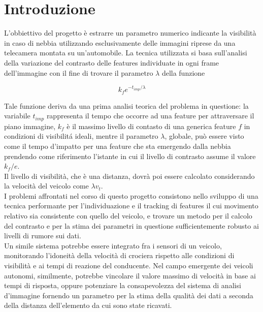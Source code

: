 \documentclass[12pt]{report}
\begin{document}

\tableofcontents

\chapter{Introduzione}

L'obbiettivo del progetto \`e estrarre un parametro numerico indicante la visibilit\`a in caso di nebbia utilizzando esclusivamente delle immagini riprese da una telecamera montata su un'automobile. La tecnica utilizzata si basa sull'analisi della variazione del contrasto delle features individuate in ogni frame dell'immagine con il fine di trovare il parametro $\lambda$ della funzione

$$k_fe^{-t_{imp}/\lambda}$$

\noindent Tale funzione deriva da una prima analisi teorica del problema in questione: la variabile $t_{imp}$ rappresenta il tempo che occorre ad una feature per attraversare il piano immagine, $k_f$ \`e il massimo livello di contasto di una generica feature $f$ in condizioni di visibilit\'a ideali, mentre il parametro $\lambda$, globale, pu\`o essere visto come il tempo d'impatto per una feature che sta emergendo dalla nebbia prendendo come riferimento l'istante in cui il livello di contrasto assume il valore $k_f/e$.\\
\noindent Il livello di visibilit\`a, che \`e una distanza, dovr\`a poi essere calcolato considerando la velocit\`a del veicolo come $\lambda v_t$.\\

\noindent I problemi affrontati nel corso di questo progetto consistono nello sviluppo di una tecnica performante per l'individuazione e il tracking di features il cui movimento relativo sia consistente con quello del veicolo, e trovare un metodo per il calcolo del contrasto e per la stima dei parametri in questione sufficientemente robusto ai livelli di rumore sui dati.\\
	 	
\noindent Un simile sistema potrebbe essere integrato fra i sensori di un veicolo, monitorando l'idoneit\`a della velocit\`a di crociera rispetto alle condizioni di visibilit\`a e ai tempi di reazione del conducente. Nel campo emergente dei veicoli autonomi, similmente, potrebbe vincolare il valore massimo di velocit\`a in base ai tempi di risposta, oppure potenziare la consapevolezza del sistema di analisi d'immagine fornendo un parametro per la stima della qualit\`a dei dati a seconda della distanza dell'elemento da cui sono state ricavati.
\end{document}
